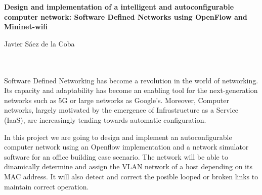 \cleardoublepage


\thispagestyle{empty}


\begin{center}
{\large\bfseries Design and implementation of a intelligent and autoconfigurable computer network: Software Defined Networks using OpenFlow and Mininet-wifi}\\
\end{center}
\begin{center}
Javier Sáez de la Coba\\
\end{center}

\\

\vspace{0.7cm}
\\

Software Defined Networking has become a revolution in the world of networking. Its capacity and adaptability has become an enabling tool for the next-generation networks such as 5G or large networks as Google's. Moreover, Computer networks, largely motivated by the emergence of Infrastructure as a Service (IaaS), are increasingly tending towards automatic configuration.

In this project we are going to design and implement an autoconfigurable computer network using an Openflow implementation and a network simulator software for an office building case scenario. The network will be able to dinamically determine and assign the VLAN network of a host depending on its MAC address. It will also detect and correct the posible looped or broken links to maintain correct operation.



